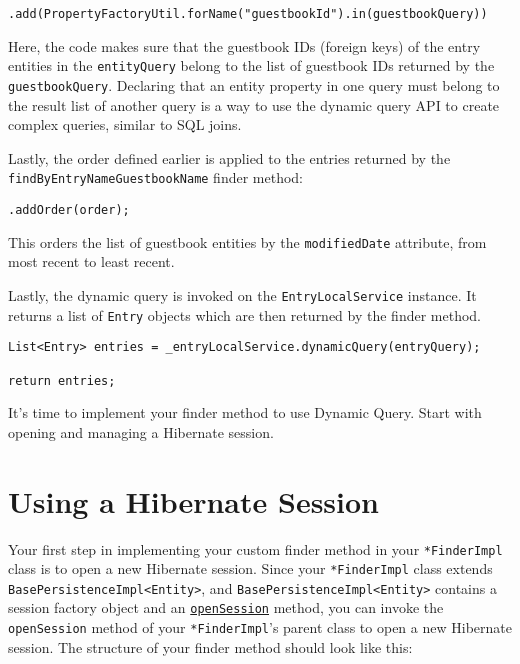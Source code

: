 \begin{verbatim}
.add(PropertyFactoryUtil.forName("guestbookId").in(guestbookQuery))
\end{verbatim}

Here, the code makes sure that the guestbook IDs (foreign keys) of the
entry entities in the \texttt{entityQuery} belong to the list of
guestbook IDs returned by the \texttt{guestbookQuery}. Declaring that an
entity property in one query must belong to the result list of another
query is a way to use the dynamic query API to create complex queries,
similar to SQL joins.

Lastly, the order defined earlier is applied to the entries returned by
the \texttt{findByEntryNameGuestbookName} finder method:

\begin{verbatim}
.addOrder(order);
\end{verbatim}

This orders the list of guestbook entities by the \texttt{modifiedDate}
attribute, from most recent to least recent.

Lastly, the dynamic query is invoked on the \texttt{EntryLocalService}
instance. It returns a list of \texttt{Entry} objects which are then
returned by the finder method.

\begin{verbatim}
List<Entry> entries = _entryLocalService.dynamicQuery(entryQuery);

return entries;
\end{verbatim}

It's time to implement your finder method to use Dynamic Query. Start
with opening and managing a Hibernate session.

\section{Using a Hibernate Session}\label{using-a-hibernate-session}

Your first step in implementing your custom finder method in your
\texttt{*FinderImpl} class is to open a new Hibernate session. Since
your \texttt{*FinderImpl} class extends
\texttt{BasePersistenceImpl\textless{}Entity\textgreater{}}, and
\texttt{BasePersistenceImpl\textless{}Entity\textgreater{}} contains a
session factory object and an
\href{https://docs.liferay.com/dxp/portal/7.2-latest/javadocs/portal-kernel/com/liferay/portal/kernel/service/persistence/impl/BasePersistenceImpl.html\#openSession--}{\texttt{openSession}}
method, you can invoke the \texttt{openSession} method of your
\texttt{*FinderImpl}'s parent class to open a new Hibernate session. The
structure of your finder method should look like this:

